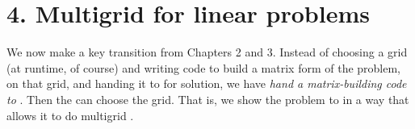 
\chapter{4. Multigrid for linear problems}

We now make a key transition from Chapters 2 and 3.  Instead of choosing a grid (at runtime, of course) and writing code to build a matrix form of the problem, on that grid, and handing it to \pKSP for solution, we have \emph{hand a matrix-building code to} \pKSP.  Then the \pKSP can choose the grid.  That is, we show the problem to \PETSc in a way that allows it to do multigrid \citep{Briggsetal2000}.



